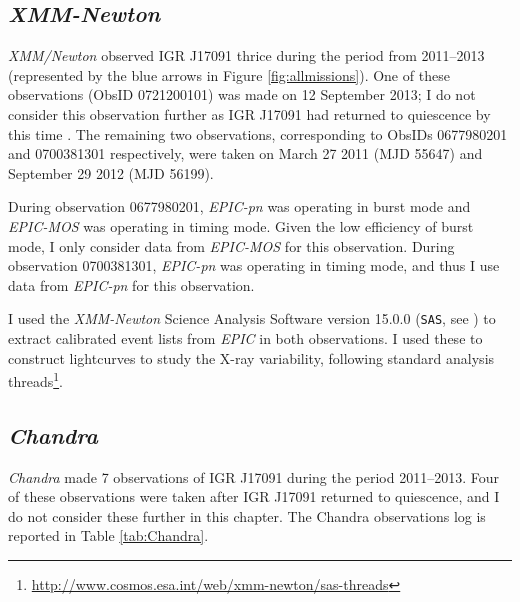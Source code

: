 \subsection{\textit{XMM-Newton}}
\label{sec:xmmdata}

\par \indexxmm\textit{XMM/Newton} observed IGR J17091 thrice during the period from 2011--2013 (represented by the blue arrows in Figure \ref{fig:allmissions}).  One of these observations (ObsID 0721200101) was made on 12 September 2013; I do not consider this observation further as IGR J17091 had returned to quiescence by this time \citep{Altamirano_Quiescence}.  The remaining two observations, corresponding to ObsIDs 0677980201 and 0700381301 respectively, were taken on March 27 2011 (MJD 55647) and September 29 2012 (MJD 56199).
\par During observation 0677980201, \indexepic\textit{EPIC-pn} was operating in burst mode and \textit{EPIC-MOS} was operating in timing mode.  Given the low efficiency of burst mode, I only consider data from \textit{EPIC-MOS} for this observation.  During observation 0700381301, \textit{EPIC-pn} was operating in timing mode, and thus I use data from \textit{EPIC-pn} for this observation.
\par I used the \textit{XMM-Newton} Science Analysis Software version 15.0.0 (\texttt{SAS}, see \citealp{Ibarra_sas}) to extract calibrated event lists from \textit{EPIC} in both observations.  I used these to construct lightcurves to study the X-ray variability, following standard analysis threads\footnote{\url{http://www.cosmos.esa.int/web/xmm-newton/sas-threads}}.

\subsection{\textit{Chandra}}

\par \indexchandra\textit{Chandra} made 7 observations of IGR J17091 during the period 2011--2013.  Four of these observations were taken after IGR J17091 returned to quiescence, and I do not consider these further in this chapter.  The Chandra observations log is reported in Table \ref{tab:Chandra}. 


